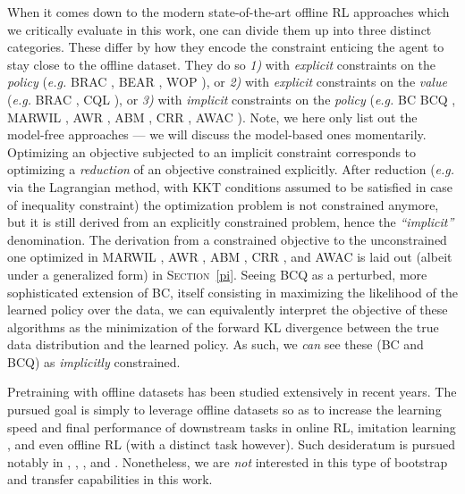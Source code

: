 When it comes down to the modern state-of-the-art offline RL approaches
which we critically evaluate in this work,
one can divide them up into three distinct categories.
These differ by how they encode the constraint
enticing the agent to stay close to the offline dataset.
They do so
\textit{1)} with \emph{explicit} constraints on the \emph{policy}
(\textit{e.g.}
BRAC \cite{Wu2019-nl},
BEAR \cite{Kumar2019-rw},
WOP \cite{Jaques2020-gb}), or
\textit{2)} with \emph{explicit} constraints on the \emph{value}
(\textit{e.g.}
BRAC \cite{Wu2019-nl},
CQL \cite{Kumar2020-zb}), or
\textit{3)} with \emph{implicit} constraints on the \emph{policy}
(\textit{e.g.}
BC \cite{Pomerleau1989-nh, Pomerleau1990-lm, Ratliff2007-fc, Bagnell2015-ni}
BCQ \cite{Fujimoto2018-mj},
MARWIL \cite{Wang2018-dn},
AWR \cite{Peng2019-hu},
ABM \cite{Siegel2020-lo},
CRR \cite{Wang2020-sr},
AWAC \cite{Nair2020-gd}).
Note, we here only list out the model-free approaches --- we will discuss the model-based ones
momentarily.
Optimizing an objective subjected to an implicit constraint corresponds to optimizing
a \emph{reduction} of an objective constrained explicitly.
After reduction (\emph{e.g.} via the Lagrangian method,
with KKT conditions assumed to be satisfied in case of inequality constraint)
the optimization problem is not constrained anymore, but it is still derived from an explicitly constrained problem,
hence the \textit{``implicit''} denomination.
The derivation from a constrained objective to the unconstrained one optimized in
MARWIL \cite{Wang2018-dn},
AWR \cite{Peng2019-hu},
ABM \cite{Siegel2020-lo},
CRR \cite{Wang2020-sr}, and
AWAC \cite{Nair2020-gd}
is laid out (albeit under a generalized form) in \textsc{Section}~\ref{pi}.
Seeing BCQ \cite{Fujimoto2018-mj}
as a perturbed, more sophisticated extension of BC,
itself consisting in maximizing the likelihood of the learned policy over the data,
we can equivalently interpret the objective of these algorithms as
the minimization of the forward KL divergence between the true data distribution and the learned policy.
As such, we \emph{can} see these (BC and BCQ) as \emph{implicitly} constrained.

Pretraining with offline datasets has been studied extensively in recent years.
The pursued goal is simply to leverage offline datasets so as to increase the learning speed and
final performance of downstream tasks in online RL, imitation learning \cite{Bagnell2015-ni},
and even offline RL (with a distinct task however).
Such desideratum is pursued notably in
\cite{Yang2021-ec},
\cite{Ajay2020-vj},
\cite{Singh2020-nm}, and
\cite{Nair2020-gd}.
Nonetheless, we are \emph{not} interested in this type of bootstrap and transfer capabilities in this work.

